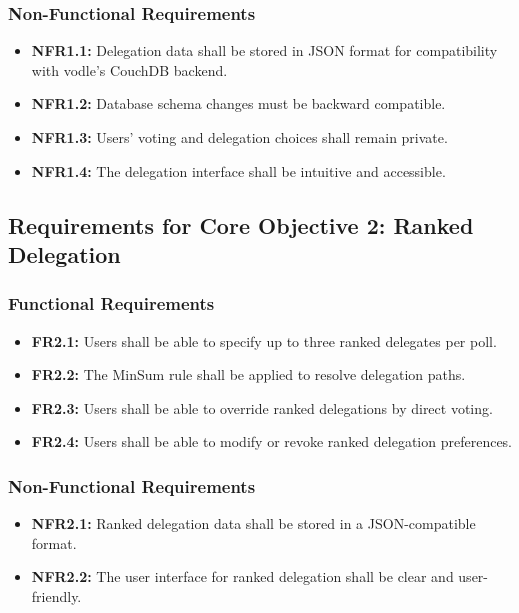 \subsubsection{Non-Functional Requirements}
\begin{itemize}
    \item \textbf{NFR1.1:} Delegation data shall be stored in JSON format for compatibility with vodle's CouchDB backend.
    \item \textbf{NFR1.2:} Database schema changes must be backward compatible.
    \item \textbf{NFR1.3:} Users' voting and delegation choices shall remain private.
    \item \textbf{NFR1.4:} The delegation interface shall be intuitive and accessible.
\end{itemize}

\subsection{Requirements for Core Objective 2: Ranked Delegation}
\subsubsection{Functional Requirements}
\begin{itemize}
    \item \textbf{FR2.1:} Users shall be able to specify up to three ranked delegates per poll.
    \item \textbf{FR2.2:} The MinSum rule shall be applied to resolve delegation paths.
    \item \textbf{FR2.3:} Users shall be able to override ranked delegations by direct voting.
    \item \textbf{FR2.4:} Users shall be able to modify or revoke ranked delegation preferences.
\end{itemize}

\subsubsection{Non-Functional Requirements}
\begin{itemize}
    \item \textbf{NFR2.1:} Ranked delegation data shall be stored in a JSON-compatible format.
    \item \textbf{NFR2.2:} The user interface for ranked delegation shall be clear and user-friendly.
\end{itemize}

